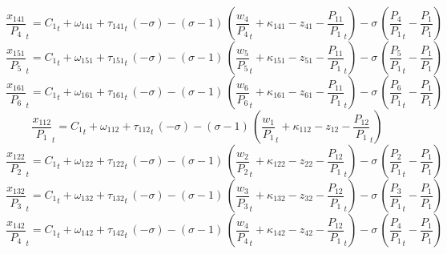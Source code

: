 \begin{dmath}
{{\frac{x_{141}}{P_{4}}}}_{t}={{C_{1}}}_{t}+{{\omega_{141}}}+{{\tau_{141}}}_{t}\, \left(-{{\sigma}}\right)-\left({{\sigma}}-1\right)\, \left({{\frac{w_{4}}{P_{4}}}}_{t}+{{\kappa_{141}}}-{{z_{41}}}-{{\frac{P_{11}}{P_{1}}}}_{t}\right)-{{\sigma}}\, \left({{\frac{P_{4}}{P_{1}}}}_{t}-{{\frac{P_{1}}{P_{1}}}}\right)
\end{dmath}
\begin{dmath}
{{\frac{x_{151}}{P_{5}}}}_{t}={{C_{1}}}_{t}+{{\omega_{151}}}+{{\tau_{151}}}_{t}\, \left(-{{\sigma}}\right)-\left({{\sigma}}-1\right)\, \left({{\frac{w_{5}}{P_{5}}}}_{t}+{{\kappa_{151}}}-{{z_{51}}}-{{\frac{P_{11}}{P_{1}}}}_{t}\right)-{{\sigma}}\, \left({{\frac{P_{5}}{P_{1}}}}_{t}-{{\frac{P_{1}}{P_{1}}}}\right)
\end{dmath}
\begin{dmath}
{{\frac{x_{161}}{P_{6}}}}_{t}={{C_{1}}}_{t}+{{\omega_{161}}}+{{\tau_{161}}}_{t}\, \left(-{{\sigma}}\right)-\left({{\sigma}}-1\right)\, \left({{\frac{w_{6}}{P_{6}}}}_{t}+{{\kappa_{161}}}-{{z_{61}}}-{{\frac{P_{11}}{P_{1}}}}_{t}\right)-{{\sigma}}\, \left({{\frac{P_{6}}{P_{1}}}}_{t}-{{\frac{P_{1}}{P_{1}}}}\right)
\end{dmath}
\begin{dmath}
{{\frac{x_{112}}{P_{1}}}}_{t}={{C_{1}}}_{t}+{{\omega_{112}}}+{{\tau_{112}}}_{t}\, \left(-{{\sigma}}\right)-\left({{\sigma}}-1\right)\, \left({{\frac{w_{1}}{P_{1}}}}_{t}+{{\kappa_{112}}}-{{z_{12}}}-{{\frac{P_{12}}{P_{1}}}}_{t}\right)
\end{dmath}
\begin{dmath}
{{\frac{x_{122}}{P_{2}}}}_{t}={{C_{1}}}_{t}+{{\omega_{122}}}+{{\tau_{122}}}_{t}\, \left(-{{\sigma}}\right)-\left({{\sigma}}-1\right)\, \left({{\frac{w_{2}}{P_{2}}}}_{t}+{{\kappa_{122}}}-{{z_{22}}}-{{\frac{P_{12}}{P_{1}}}}_{t}\right)-{{\sigma}}\, \left({{\frac{P_{2}}{P_{1}}}}_{t}-{{\frac{P_{1}}{P_{1}}}}\right)
\end{dmath}
\begin{dmath}
{{\frac{x_{132}}{P_{3}}}}_{t}={{C_{1}}}_{t}+{{\omega_{132}}}+{{\tau_{132}}}_{t}\, \left(-{{\sigma}}\right)-\left({{\sigma}}-1\right)\, \left({{\frac{w_{3}}{P_{3}}}}_{t}+{{\kappa_{132}}}-{{z_{32}}}-{{\frac{P_{12}}{P_{1}}}}_{t}\right)-{{\sigma}}\, \left({{\frac{P_{3}}{P_{1}}}}_{t}-{{\frac{P_{1}}{P_{1}}}}\right)
\end{dmath}
\begin{dmath}
{{\frac{x_{142}}{P_{4}}}}_{t}={{C_{1}}}_{t}+{{\omega_{142}}}+{{\tau_{142}}}_{t}\, \left(-{{\sigma}}\right)-\left({{\sigma}}-1\right)\, \left({{\frac{w_{4}}{P_{4}}}}_{t}+{{\kappa_{142}}}-{{z_{42}}}-{{\frac{P_{12}}{P_{1}}}}_{t}\right)-{{\sigma}}\, \left({{\frac{P_{4}}{P_{1}}}}_{t}-{{\frac{P_{1}}{P_{1}}}}\right)
\end{dmath}
